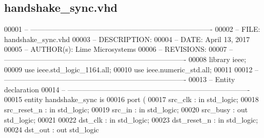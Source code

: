 \subsection{handshake\+\_\+sync.\+vhd}
\label{handshake__sync_8vhd_source}

\begin{DoxyCode}
00001 \textcolor{keyword}{-- ---------------------------------------------------------------------------- }
00002 \textcolor{keyword}{-- FILE:    handshake\_sync.vhd}
00003 \textcolor{keyword}{-- DESCRIPTION: }
00004 \textcolor{keyword}{-- DATE:    April 13, 2017}
00005 \textcolor{keyword}{-- AUTHOR(s):   Lime Microsystems}
00006 \textcolor{keyword}{-- REVISIONS:}
00007 \textcolor{keyword}{-- ---------------------------------------------------------------------------- }
00008 \textcolor{vhdlkeyword}{library }\textcolor{keywordflow}{ieee};
00009 \textcolor{vhdlkeyword}{use }ieee.std\_logic\_1164.\textcolor{keywordflow}{all};
00010 \textcolor{vhdlkeyword}{use }ieee.numeric\_std.\textcolor{keywordflow}{all};
00011 
00012 \textcolor{keyword}{-- ----------------------------------------------------------------------------}
00013 \textcolor{keyword}{-- Entity declaration}
00014 \textcolor{keyword}{-- ----------------------------------------------------------------------------}
00015 \textcolor{keywordflow}{entity }handshake_sync \textcolor{keywordflow}{is}
00016    \textcolor{keywordflow}{port} \textcolor{vhdlchar}{(}
00017       \textcolor{vhdlchar}{src_clk}        \textcolor{vhdlchar}{:} \textcolor{keywordflow}{in} \textcolor{comment}{std\_logic};
00018       \textcolor{vhdlchar}{src_reset_n}    \textcolor{vhdlchar}{:} \textcolor{keywordflow}{in} \textcolor{comment}{std\_logic};
00019       \textcolor{vhdlchar}{src_in}         \textcolor{vhdlchar}{:} \textcolor{keywordflow}{in} \textcolor{comment}{std\_logic};
00020       \textcolor{vhdlchar}{src_busy}       \textcolor{vhdlchar}{:} \textcolor{keywordflow}{out} \textcolor{comment}{std\_logic};
00021       
00022       \textcolor{vhdlchar}{dst_clk}        \textcolor{vhdlchar}{:} \textcolor{keywordflow}{in} \textcolor{comment}{std\_logic};
00023       \textcolor{vhdlchar}{dst_reset_n}    \textcolor{vhdlchar}{:} \textcolor{keywordflow}{in} \textcolor{comment}{std\_logic};
00024       \textcolor{vhdlchar}{dst_out}        \textcolor{vhdlchar}{:} \textcolor{keywordflow}{out} \textcolor{comment}{std\_logic}     

\end{DoxyCode}
